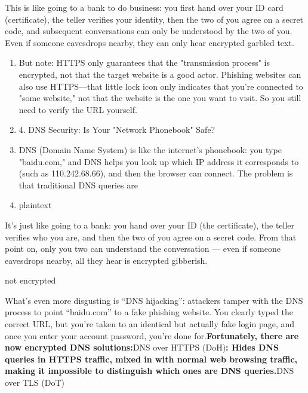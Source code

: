 
This is like going to a bank to do business: you first hand over your ID card (certificate), the teller verifies your identity, then the two of you agree on a secret code, and subsequent conversations can only be understood by the two of you. Even if someone eavesdrops nearby, they can only hear encrypted garbled text.

\begin{enumerate}
  \item But note: HTTPS only guarantees that the "transmission process" is encrypted, not that the target website is a good actor. Phishing websites can also use HTTPS—that little lock icon only indicates that you're connected to "some website," not that the website is the one you want to visit. So you still need to verify the URL yourself.
  \item 4. DNS Security: Is Your "Network Phonebook" Safe?
  \item DNS (Domain Name System) is like the internet's phonebook: you type "baidu.com," and DNS helps you look up which IP address it corresponds to (such as 110.242.68.66), and then the browser can connect. The problem is that traditional DNS queries are
  \item plaintext
\end{enumerate}

It's just like going to a bank: you hand over your ID (the certificate), the teller verifies who you are, and then the two of you agree on a secret code. From that point on, only you two can understand the conversation — even if someone eavesdrops nearby, all they hear is encrypted gibberish.

not encrypted


What's even more disgusting is “DNS hijacking”: attackers tamper with the DNS process to point “baidu.com” to a fake phishing website. You clearly typed the correct URL, but you're taken to an identical but actually fake login page, and once you enter your account password, you're done for.\textbf{Fortunately, there are now encrypted DNS solutions:}DNS over HTTPS (DoH)\textbf{: Hides DNS queries in HTTPS traffic, mixed in with normal web browsing traffic, making it impossible to distinguish which ones are DNS queries.}DNS over TLS (DoT)

